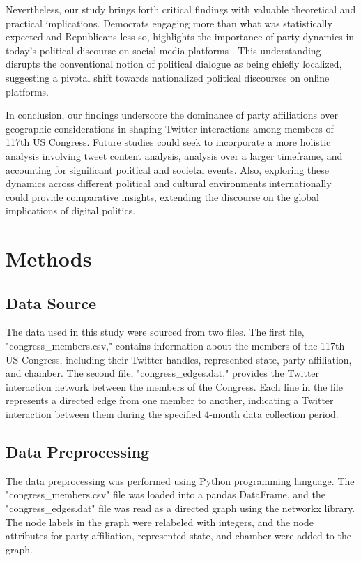\documentclass[11pt]{article}
\begin{document}
Nevertheless, our study brings forth critical findings with valuable theoretical and practical implications. Democrats engaging more than what was statistically expected and Republicans less so, highlights the importance of party dynamics in today's political discourse on social media platforms \cite{Tucker2018SocialMP}. This understanding disrupts the conventional notion of political dialogue as being chiefly localized, suggesting a pivotal shift towards nationalized political discourses on online platforms. 

In conclusion, our findings underscore the dominance of party affiliations over geographic considerations in shaping Twitter interactions among members of 117th US Congress. Future studies could seek to incorporate a more holistic analysis involving tweet content analysis, analysis over a larger timeframe, and accounting for significant political and societal events. Also, exploring these dynamics across different political and cultural environments internationally could provide comparative insights, extending the discourse on the global implications of digital politics.

\section*{Methods}

\subsection*{Data Source}
The data used in this study were sourced from two files. The first file, "congress\_members.csv," contains information about the members of the 117th US Congress, including their Twitter handles, represented state, party affiliation, and chamber. The second file, "congress\_edges.dat," provides the Twitter interaction network between the members of the Congress. Each line in the file represents a directed edge from one member to another, indicating a Twitter interaction between them during the specified 4-month data collection period.

\subsection*{Data Preprocessing}
The data preprocessing was performed using Python programming language. The "congress\_members.csv" file was loaded into a pandas DataFrame, and the "congress\_edges.dat" file was read as a directed graph using the networkx library. The node labels in the graph were relabeled with integers, and the node attributes for party affiliation, represented state, and chamber were added to the graph.
\end{document}
